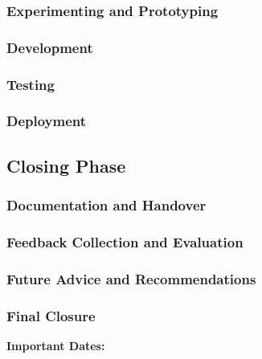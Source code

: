\documentclass[12pt,a4paper]{article}
\begin{document}
\subsubsection{Experimenting and Prototyping}
\subsubsection{Development}
\subsubsection{Testing}
\subsubsection{Deployment}
\subsection{Closing Phase}
\subsubsection{Documentation and Handover}
\subsubsection{Feedback Collection and Evaluation}
\subsubsection{Future Advice and Recommendations}
\subsubsection{Final Closure}

\newpage %

\begin{center} %
{\small\bfseries Important Dates:\par} %
\end{center}
\end{document}
